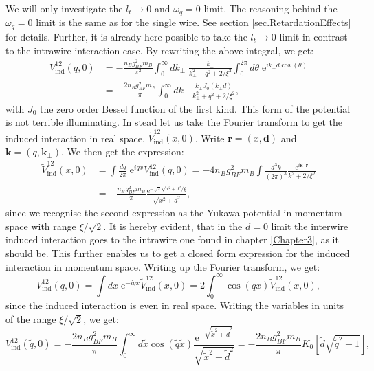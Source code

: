 We will only investigate the $l_t \to 0$ and $\omega_q = 0$ limit. The reasoning behind the $\omega_q = 0$ limit is the same as for the single wire. See section \ref{sec.RetardationEffects} for details. Further, it is already here possible to take the $l_t \to 0$ limit in contrast to the intrawire interaction case. By rewriting the above integral, we get:
\begin{align}
V_{\text{ind}}^{12}(q,0) &= -\frac{n_Bg_{BF}^2m_B}{\pi^2}\int_0^\infty d k_\perp \; \frac{k_\perp}{k_\perp^2 + q^2 + 2/\xi^2} \int_0^{2\pi} d\theta \; \text{e}^{ik_\perp d\cos(\theta)} \nonumber \\
						  &= -\frac{2n_Bg_{BF}^2m_B}{\pi}\int_0^\infty d k_\perp \; \frac{k_\perp J_0(k_\perp d)}{k_\perp^2 + q^2 + 2/\xi^2},
\label{eq.secondwireinducedinteractionmomentumspaceintegralexpression}
\end{align}
with $J_0$ the zero order Bessel function of the first kind. This form of the potential is not terrible illuminating. In stead let us take the Fourier transform to get the induced interaction in real space, $\tilde{V}_{\text{ind}}^{12}(x,0)$. Write $\mathbf{r} = (x,\mathbf{d})$ and $\mathbf{k} = (q,\mathbf{k}_\perp)$. We then get the expression:
\begin{align}
\tilde{V}_{\text{ind}}^{12}(x,0) &= \int \frac{dq}{2\pi} \; \text{e}^{iqx} V_{\text{ind}}^{12}(q,0) = -4n_Bg^2_{BF}m_B\int \frac{d^3k}{(2\pi)^3} \frac{\text{e}^{i\mathbf{k}\cdot \mathbf{r}}}{k^2 + 2/\xi^2} \nonumber \\
								  &= -\frac{n_Bg^2_{BF}m_B}{\pi} \frac{\text{e}^{-\sqrt{2}\sqrt{x^2+d^2}/\xi}}{\sqrt{x^2+d^2}},
\end{align}
since we recognise the second expression as the Yukawa potential in momentum space with range $\xi/\sqrt{2}$. It is hereby evident, that in the $d = 0$ limit the interwire induced interaction goes to the intrawire one found in chapter \ref{Chapter3}, as it should be. This further enables us to get a closed form expression for the induced interaction in momentum space. Writing up the Fourier transform, we get:
\begin{equation}
V_{\text{ind}}^{12}(q,0) = \int dx \; \text{e}^{-iqx}\tilde{V}_{\text{ind}}^{12}(x,0) = 2\int_0^\infty \cos(qx)\tilde{V}_{\text{ind}}^{12}(x,0), \nonumber
\end{equation}
since the induced interaction is even in real space. Writing the variables in units of the range $\xi/\sqrt{2}$, we get:
\begin{equation}
V_{\text{ind}}^{12}(\tilde{q},0) = -\frac{2n_Bg^2_{BF}m_B}{\pi}\int_0^\infty d\tilde{x} \cos(\tilde{q}\tilde{x})\frac{ \text{e}^{ -\sqrt{\tilde{x}^2+\tilde{d}^2} } }{\sqrt{\tilde{x}^2+\tilde{d}^2}} = -\frac{2n_Bg^2_{BF}m_B}{\pi}K_0\left[\tilde{d}\sqrt{\tilde{q}^2+1}\right], \nonumber
\end{equation}

